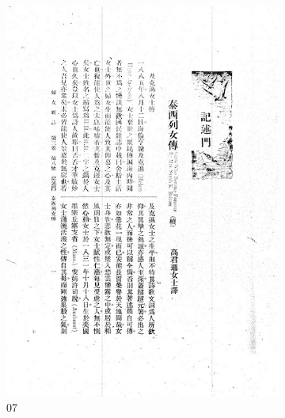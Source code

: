 \documentclass[12pt,twoside]{report}
\begin{document}
\begin{appendices}
\begin{figure}[htbp]
\begin{subfigure}[b]{0.23\linewidth}
        \includegraphics[width=\linewidth]{./figures/testset/07.jpg}
        \caption{07}
        \label{fig:test_07}
    \end{subfigure}
    \hfill
    \begin{subfigure}[b]{0.23\linewidth}

\end{subfigure}
\end{figure}
\end{appendices}
\end{document}
